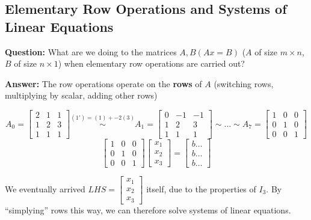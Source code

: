 
\subsection{Elementary Row Operations and Systems of Linear Equations}
\textbf{Question:} What are we doing to the matrices \(A, B (Ax = B)\) (\(A\) of size \(m \times n\), \(B\) of size \(n \times 1\)) when elementary row operations are carried out?

\textbf{Answer:} The row operations operate on the \textbf{rows} of \(A\) (switching rows, multiplying by scalar, adding other rows)

\begin{example}
    \[
        A_0 = \left[\begin{array}{ccc}
                2 & 1 & 1 \\
                1 & 2 & 3 \\
                1 & 1 & 1
            \end{array}\right]
        \overset{(1') = (1) + -2(3)}{\sim}
        A_1 = \left[\begin{array}{ccc}
                0 & -1 & -1 \\
                1 & 2  & 3  \\
                1 & 1  & 1
            \end{array}\right]
        \sim \dots \sim
        A_7 = \left[\begin{array}{ccc}
                1 & 0 & 0 \\
                0 & 1 & 0 \\
                0 & 0 & 1
            \end{array}\right]
    \]
    \[
        \left[\begin{array}{ccc}
                1 & 0 & 0 \\
                0 & 1 & 0 \\
                0 & 0 & 1
            \end{array}\right]
        \left[\begin{array}{c}
                x_1 \\
                x_2 \\
                x_3
            \end{array}\right] =
        \left[\begin{array}{c}
                b \dots \\
                b \dots \\
                b \dots
            \end{array}\right]
    \]

    We eventually arrived \(LHS = \left[\begin{array}{c}
            x_1 \\
            x_2 \\
            x_3
        \end{array}\right]\) itself, due to the properties of \(I_3\). By ``simplying'' rows this way, we can therefore solve systems of linear equations.
\end{example}

